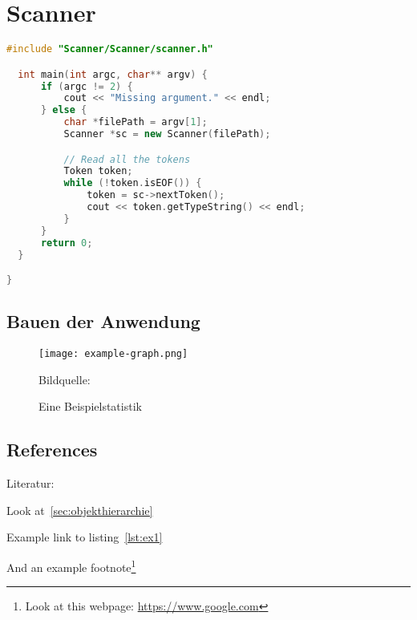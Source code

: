 \chapter{Scanner}\label{chap:intro}

\lipsum[1]{}

\begin{lstlisting}[language=C++,numbers=none,caption=Die main() Methode,label=lst:ex1]
  #include "Scanner/Scanner/scanner.h"

  int main(int argc, char** argv) {
      if (argc != 2) {
          cout << "Missing argument." << endl;
      } else {
          char *filePath = argv[1];
          Scanner *sc = new Scanner(filePath);

          // Read all the tokens
          Token token;
          while (!token.isEOF()) {
              token = sc->nextToken();
              cout << token.getTypeString() << endl;
          }
      }
      return 0;
  }

}
\end{lstlisting}

\section{Bauen der Anwendung}
\lipsum{}

\begin{figure}[!htb]
    \centering
      \texttt{[image: example-graph.png]}
    \caption{Eine Beispielstatistik}{Bildquelle:~\cite{JavaBeginner-Binding}}\label{fig:example}
\end{figure}

\lipsum{}
\section{References}

Literatur:~\cite{Example}

Look at~\ref{sec:objekthierarchie}

Example link to listing~\ref{lst:ex1}

And an example footnote\footnote{Look at this webpage: \url{https://www.google.com}}

\lipsum[2-3]{}%
